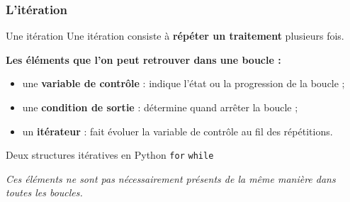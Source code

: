 \documentclass[10pt]{beamer}
\begin{document}
\begin{frame}
	\frametitle{L'itération}
	

	\begin{block}{Une itération}
		Une itération consiste à \textbf{répéter un traitement}
		plusieurs fois.
	\end{block}
	
	\vspace{0.15cm}
	
	\textbf{Les éléments que l'on peut retrouver dans une boucle :}
	
	\begin{itemize}
		\item une \textbf{variable de contrôle} : indique l'état ou la progression de la boucle ;
		\item une \textbf{condition de sortie} : détermine quand arrêter la boucle ;
		\item un \textbf{itérateur} : fait évoluer la variable de contrôle
		au fil des répétitions.
	\end{itemize}
	
	\vspace{0.1cm}
	
	\begin{exampleblock}{Deux structures itératives en Python}
		\centering
		\texttt{for}
		\qquad\qquad
		\texttt{while}
	\end{exampleblock}
	
	\centering
	\small
	\textit{Ces éléments ne sont pas nécessairement présents de la même manière
		dans toutes les boucles.}
	
\end{frame}
\end{document}
